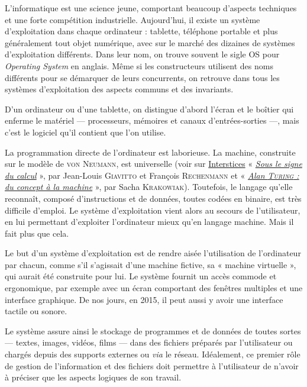 L’informatique est une science jeune, comportant beaucoup d’aspects techniques et une forte compétition industrielle. Aujourd’hui, il existe un système d’exploitation dans chaque ordinateur : tablette, téléphone portable et plus généralement tout objet numérique, avec sur le marché des dizaines de systèmes d'exploitation différents. Dans leur nom, on trouve souvent le sigle OS pour \textit{Operating System} en anglais. Même si les constructeurs utilisent des noms différents pour se démarquer de leurs concurrents, on retrouve dans tous les systèmes d’exploitation des aspects communs et des invariants.

D’un ordinateur ou d’une tablette, on distingue d’abord l’écran et le boîtier qui enferme le matériel --- processeurs, mémoires et canaux d’entrées-sorties ---, mais c’est le logiciel qu’il contient que l’on utilise.

La programmation directe de l’ordinateur est laborieuse. La machine, construite sur le modèle de \textsc{von Neumann}, est universelle (voir sur \href{https://interstices.info/}{Interstices} « \href{https://interstices.info/sous-le-signe-du-calcul/}{\textit{Sous le signe du calcul}} », par Jean-Louis \textsc{Giavitto} et François \textsc{Rechenmann} et « \href{https://interstices.info/alan-turing-du-concept-a-la-machine/}{\textit{Alan \textsc{Turing} : du concept à la machine}} », par Sacha \textsc{Krakowiak}). Toutefois, le langage qu’elle reconnaît, composé d’instructions et de données, toutes codées en binaire, est très difficile d’emploi. Le système d’exploitation vient alors au secours de l’utilisateur, en lui permettant d’exploiter l’ordinateur mieux qu’en langage machine. Mais il fait plus que cela.


Le but d’un système d’exploitation est de rendre aisée l’utilisation de l’ordinateur par chacun, comme s’il s’agissait d’une machine fictive, sa « machine virtuelle », qui aurait été construite pour lui. Le système fournit un accès commode et ergonomique, par exemple avec un écran comportant des fenêtres multiples et une interface graphique. De nos jours, en 2015, il peut aussi y avoir une interface tactile ou sonore.\nopagebreak

Le système assure ainsi le stockage de programmes et de données de toutes sortes --- textes, images, vidéos, films --- \pagebreak dans des fichiers préparés par l’utilisateur ou chargés depuis des supports externes ou \textit{via} le réseau. Idéalement, ce premier rôle de gestion de l’information et des fichiers doit permettre à l’utilisateur de n’avoir à préciser que les aspects logiques de son travail.

